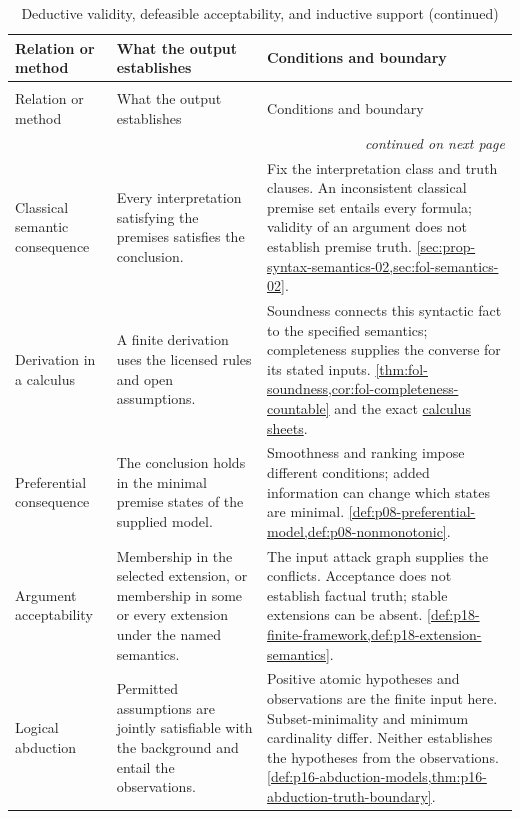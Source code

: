 \begin{longtable}{@{}p{}p{}p{}@{}}
\caption{Deductive validity, defeasible acceptability, and inductive support}\\
\toprule
Relation or method & What the output establishes & Conditions and boundary \\
\midrule
\endfirsthead
\caption[]{Deductive validity, defeasible acceptability, and inductive support (continued)}\\
\toprule
Relation or method & What the output establishes & Conditions and boundary \\
\midrule
\endhead
\midrule\multicolumn{3}{r}{\emph{continued on next page}}\\
\endfoot
\endlastfoot
Classical semantic consequence & Every interpretation satisfying the
premises satisfies the conclusion. & Fix the interpretation class and
truth clauses. An inconsistent classical premise set entails every formula;
validity of an argument does not establish premise truth.
\cref{sec:prop-syntax-semantics-02,sec:fol-semantics-02}. \\
Derivation in a calculus & A finite derivation uses the licensed rules and
open assumptions. & Soundness connects this syntactic fact to the specified
semantics; completeness supplies the converse for its stated inputs.
\cref{thm:fol-soundness,cor:fol-completeness-countable} and the exact
\hyperref[sec:p14-rule-sheets]{calculus sheets}. \\
Preferential consequence & The conclusion holds in the minimal premise
states of the supplied model. & Smoothness and ranking impose different
conditions; added information can change which states are minimal.
\cref{def:p08-preferential-model,def:p08-nonmonotonic}. \\
Argument acceptability & Membership in the selected extension, or membership
in some or every extension under the named semantics. & The input attack
graph supplies the conflicts. Acceptance does not establish factual truth;
stable extensions can be absent.
\cref{def:p18-finite-framework,def:p18-extension-semantics}. \\
Logical abduction & Permitted assumptions are jointly satisfiable with the
background and entail the observations. & Positive atomic hypotheses and
observations are the finite input here. Subset-minimality and minimum
cardinality differ. Neither establishes the hypotheses from the observations.
\cref{def:p16-abduction-models,thm:p16-abduction-truth-boundary}. \\

\end{longtable}
